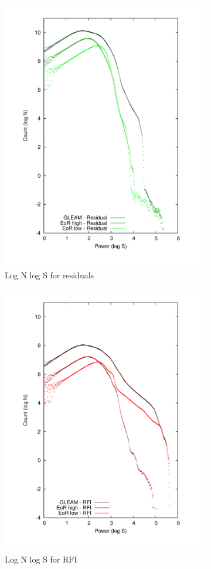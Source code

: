 \documentclass[useAMS,usenatbib]{mn2e}
\begin{document}
\noindent\begin{figure}
\begin{center}\hspace*{-0.2cm}\includegraphics[width=9.1cm]{img/lognlogs-residual}
\caption{Log N log S for residuals}
\label{fig:lognlogs-residuals}
\end{center}
\end{figure}


\noindent\begin{figure}
\begin{center}\hspace*{-0.2cm}\includegraphics[width=9.1cm]{img/lognlogs-rfi}
\caption{Log N log S for RFI }
\label{fig:lognlogs-rfi}
\end{center}
\end{figure}
\end{document}
